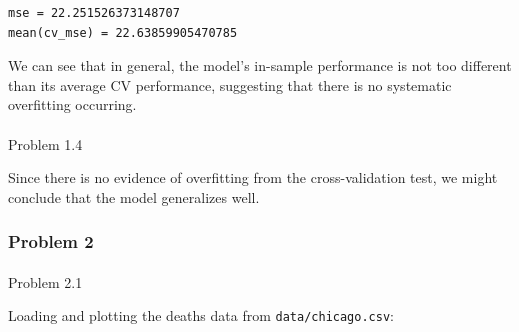 \documentclass[
  letterpaper,
  DIV=11,
  numbers=noendperiod]{scrartcl}
\makeatletter
\let\oldparagraph\paragraph
\renewcommand{\paragraph}{
    \@ifstar
      \xxxParagraphStar
      \xxxParagraphNoStar
  }
\newcommand{\xxxParagraphStar}[1]{\oldparagraph*{#1}\mbox{}}
\newcommand{\xxxParagraphNoStar}[1]{\oldparagraph{#1}\mbox{}}
\makeatother
\begin{document}
\begin{verbatim}
mse = 22.251526373148707
mean(cv_mse) = 22.63859905470785
\end{verbatim}

We can see that in general, the model's in-sample performance is not too
different than its average CV performance, suggesting that there is no
systematic overfitting occurring.

\paragraph{Problem 1.4}\label{problem-1.4}

Since there is no evidence of overfitting from the cross-validation
test, we might conclude that the model generalizes well.

\subsubsection{Problem 2}\label{problem-2}

\paragraph{Problem 2.1}\label{problem-2.1}

Loading and plotting the deaths data from \texttt{data/chicago.csv}:
\end{document}
